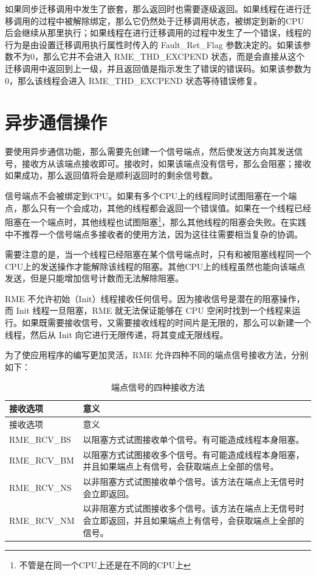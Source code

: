如果同步迁移调用中发生了嵌套，那么返回时也需要逐级返回。如果线程在进行迁移调用的过程中被解除绑定，那么它仍然处于迁移调用状态，被绑定到新的CPU后会继续从那里执行；如果线程在进行迁移调用的过程中发生了一个错误，线程的行为是由设置迁移调用执行属性时传入的 Fault\_Ret\_Flag 参数决定的。如果该参数不为0，那么它并不会进入 RME\_THD\_EXCPEND 状态，而是会直接从这个迁移调用中返回到上一级，并且返回值是指示发生了错误的错误码。如果该参数为0，那么该线程会进入 RME\_THD\_EXCPEND 状态等待错误修复。

\section{异步通信操作}\label{sec:5-async-communication-operations}

要使用异步通信功能，那么需要先创建一个信号端点，然后使发送方向其发送信号，接收方从该端点接收即可。接收时，如果该端点没有信号，那么会阻塞；接收如果成功，那么返回值将会是顺利返回时的剩余信号数。

信号端点不会被绑定到CPU。如果有多个CPU上的线程同时试图阻塞在一个端点，那么只有一个会成功，其他的线程都会返回一个错误值。如果在一个线程已经阻塞在一个端点时，其他线程也试图阻塞\footnote{不管是在同一个CPU上还是在不同的CPU上}，那么其他线程的阻塞会失败。在实践中不推荐一个信号端点多接收者的使用方法，因为这往往需要相当复杂的协调。

需要注意的是，当一个线程已经阻塞在某个信号端点时，只有和被阻塞线程同一个CPU上的发送操作才能解除该线程的阻塞。其他CPU上的线程虽然也能向该端点发送，但是只能增加信号计数而无法解除阻塞。

RME 不允许初始（Init）线程接收任何信号。因为接收信号是潜在的阻塞操作，而 Init 线程一旦阻塞，RME 就无法保证能够在 CPU 空闲时找到一个线程来运行。如果既需要接收信号，又需要接收线程的时间片是无限的，那么可以新建一个线程，然后从 Init 向它进行无限传递，将其变成无限线程。

为了使应用程序的编写更加灵活，RME 允许四种不同的端点信号接收方法，分别如下：

\begin{xltabular}{\textwidth}{@{}>{\hsize\raggedright\arraybackslash}X>{\hsize\raggedright\arraybackslash}X@{}}
\caption{端点信号的四种接收方法}\label{tab:5-1-endpoint-signal-receive-methods}\\
\toprule
接收选项 & 意义\tabularnewline
\endfirsthead
\toprule
接收选项 & 意义\tabularnewline
\midrule
\endhead
\bottomrule
\endlastfoot
RME\_RCV\_BS &
以阻塞方式试图接收单个信号。有可能造成线程本身阻塞。\tabularnewline
RME\_RCV\_BM &
以阻塞方式试图接收多个信号。有可能造成线程本身阻塞，并且如果端点上有信号，会获取端点上全部的信号。\tabularnewline
RME\_RCV\_NS &
以非阻塞方式试图接收单个信号。该方法在端点上无信号时会立即返回。\tabularnewline
RME\_RCV\_NM &
以非阻塞方式试图接收多个信号。该方法在端点上无信号时会立即返回，并且如果端点上有信号，会获取端点上全部的信号。\tabularnewline
\end{xltabular}

